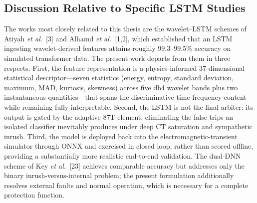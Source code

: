\documentclass[12pt,a4paper,oneside]{report}
\begin{document}
\subsection{Discussion Relative to Specific LSTM Studies}
The works most closely related to this thesis are the wavelet--LSTM schemes of Atiyah \textit{et al.}\ [3] and Alhamd \textit{et al.}\ [1,2], which established that an LSTM ingesting wavelet-derived features attains roughly 99.3--99.5\% accuracy on simulated transformer data. The present work departs from them in three respects. First, the feature representation is a physics-informed 37-dimensional statistical descriptor---seven statistics (energy, entropy, standard deviation, maximum, MAD, kurtosis, skewness) across five db4 wavelet bands plus two instantaneous quantities---that spans the discriminative time-frequency content while remaining fully interpretable. Second, the LSTM is not the final arbiter: its output is gated by the adaptive 87T element, eliminating the false trips an isolated classifier inevitably produces under deep CT saturation and sympathetic inrush. Third, the model is deployed back into the electromagnetic-transient simulator through ONNX and exercised in closed loop, rather than scored offline, providing a substantially more realistic end-to-end validation. The dual-DNN scheme of Key \textit{et al.}\ [23] achieves comparable accuracy but addresses only the binary inrush-versus-internal problem; the present formulation additionally resolves external faults and normal operation, which is necessary for a complete protection function.
\end{document}
